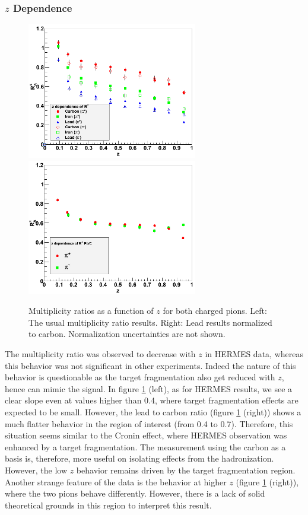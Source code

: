 \subsubsection{$z$ Dependence}

\begin{figure}[tbp]
\centering
\includegraphics[width=7.4cm] {chap6-fig/F_RvZ.png} 
\includegraphics[width=7.4cm] {chap6-fig/F_RvZ_PbC.png} 
\caption {Multiplicity ratios as a function of $z$ for both charged pions. Left: The usual multiplicity ratio results. Right: Lead results normalized to carbon. 
Normalization uncertainties are not shown.}
\label{fig:Rz}
\end{figure}

The multiplicity ratio was observed to decrease with $z$ in HERMES data, 
whereas this behavior was not significant in other experiments. Indeed the 
nature of this behavior is questionable as the target fragmentation also get reduced 
with $z$, hence can mimic the signal. In figure \ref{fig:Rz} (left), as for HERMES results, we see a clear slope even at values higher than 0.4, where target fragmentation effects are expected to be small. However, the lead to carbon ratio (figure \ref{fig:Rz} (right)) shows a much flatter behavior in the region of interest (from 0.4 to 0.7). Therefore, this situation seems similar to the Cronin effect, where HERMES observation was enhanced by a target fragmentation. The measurement using the carbon as a basis is, therefore, more useful on isolating effects from the hadronization. However, the low $z$ behavior remains driven by the target fragmentation region. Another strange feature of the data is the behavior at higher $z$ (figure \ref{fig:Rz} (right)), where the two pions behave differently. However, there is a lack of solid theoretical grounds in this region to interpret this result.

